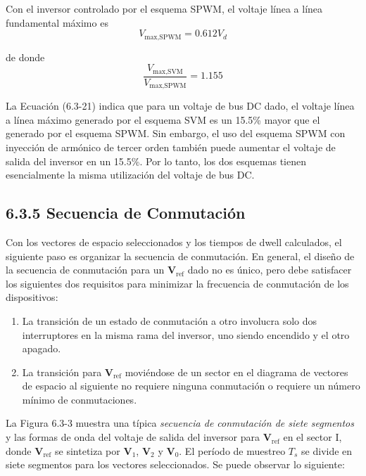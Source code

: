\documentclass[letterpaper,12pt]{article}
\begin{document}
Con el inversor controlado por el esquema SPWM, el voltaje línea a línea fundamental máximo es
\[
V_{\text{max,SPWM}} = 0.612V_d
\]
    
de donde
\[
\frac{V_{\text{max,SVM}}}{V_{\text{max,SPWM}}} = 1.155
\]
    
La Ecuación (6.3-21) indica que para un voltaje de bus DC dado, el voltaje línea a línea máximo generado por el esquema SVM es un 15.5\% mayor que el generado por el esquema SPWM. Sin embargo, el uso del esquema SPWM con inyección de armónico de tercer orden también puede aumentar el voltaje de salida del inversor en un 15.5\%. Por lo tanto, los dos esquemas tienen esencialmente la misma utilización del voltaje de bus DC.

\subsection*{6.3.5 Secuencia de Conmutación}
    
Con los vectores de espacio seleccionados y los tiempos de dwell calculados, el siguiente paso es organizar la secuencia de conmutación. En general, el diseño de la secuencia de conmutación para un \( \mathbf{V}_{\text{ref}} \) dado no es único, pero debe satisfacer los siguientes dos requisitos para minimizar la frecuencia de conmutación de los dispositivos:
    
\begin{enumerate}
    \item La transición de un estado de conmutación a otro involucra solo dos interruptores en la misma rama del inversor, uno siendo encendido y el otro apagado.
    \item La transición para \( \mathbf{V}_{\text{ref}} \) moviéndose de un sector en el diagrama de vectores de espacio al siguiente no requiere ninguna conmutación o requiere un número mínimo de conmutaciones.
\end{enumerate}
    
La Figura 6.3-3 muestra una típica \textit{secuencia de conmutación de siete segmentos} y las formas de onda del voltaje de salida del inversor para \( \mathbf{V}_{\text{ref}} \) en el sector I, donde \( \mathbf{V}_{\text{ref}} \) se sintetiza por \( \mathbf{V}_1 \), \( \mathbf{V}_2 \) y \( \mathbf{V}_0 \). El período de muestreo \( T_s \) se divide en siete segmentos para los vectores seleccionados. Se puede observar lo siguiente:
    
\end{document}
